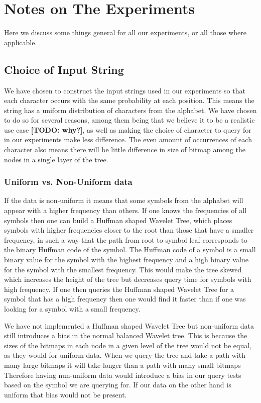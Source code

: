 \section{Notes on The Experiments}
Here we discuss some things general for all our experiments, or all those where applicable.

\subsection{Choice of Input String}
We have chosen to construct the input strings used in our experiments so that each character occurs with the same probability at each position.
This means the string has a uniform distribution of characters from the alphabet.
We have chosen to do so for several reasons, among them being that we believe it to be a realistic use case \textbf{[TODO: why?]}, as well as making the choice of character to query for in our experiments make less difference.
The even amount of occurrences of each character also means there will be little difference in size of bitmap among the nodes in a single layer of the tree.

\subsubsection{Uniform vs. Non-Uniform data}
If the data is non-uniform it means that some symbols from the alphabet will appear with a higher frequency than others.
If one knows the frequencies of all symbols then one can build a Huffman shaped Wavelet Tree, which places symbols with higher frequencies closer to the root than those that have a smaller frequency, in such a way that the path from root to symbol leaf corresponds to the binary Huffman code of the symbol. 
The Huffman code of a symbol is a small binary value for the symbol with the highest frequency and a high binary value for the symbol with the smallest frequency.
This would make the tree skewed which increases the height of the tree but decreases query time for symbols with high frequency.
If one then queries the Huffman shaped Wavelet Tree for a symbol that has a high frequency then one would find it faster than if one was looking for a symbol with a small frequency.

We have not implemented a Huffman shaped Wavelet Tree but non-uniform data still introduces a bias in the normal balanced Wavelet tree.
This is because the sizes of the bitmaps in each node in a given level of the tree would not be equal, as they would for uniform data.
When we query the tree and take a path with many large bitmaps it will take longer than a path with many small bitmaps
Therefore having nun-uniform data would introduce a bias in our query tests based on the symbol we are querying for. 
If our data on the other hand is uniform that bias would not be present.

